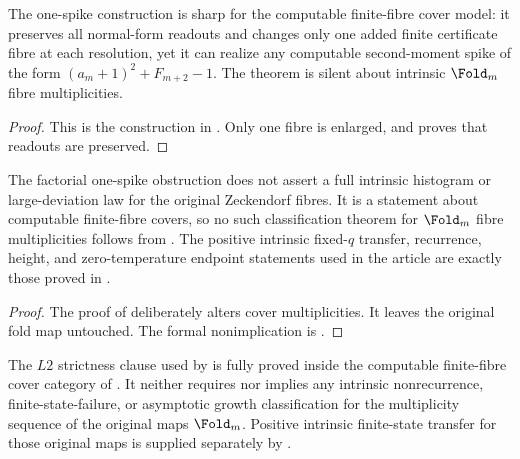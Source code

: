 \begin{theorem}
\label{prop:cover-only-strictness-boundary}
\label{thm:one-spike-finite-state-boundary}
The one-spike construction is sharp for the computable finite-fibre cover model:
it preserves all normal-form readouts and changes only one added finite
certificate fibre at each resolution, yet it can realize any computable
second-moment spike of the form \((a_m+1)^2+F_{m+2}-1\).  The theorem is silent
about intrinsic \(\Fold_m\) fibre multiplicities.
\end{theorem}

\begin{proof}
This is the construction in .
Only one fibre is enlarged, and  proves that
readouts are preserved.
\end{proof}

\begin{theorem}
\label{thm:intrinsic-fold-asymptotics-split}
The factorial one-spike obstruction does not assert a full intrinsic histogram or
large-deviation law for the original Zeckendorf fibres.  It is a statement about
computable finite-fibre covers, so no such classification theorem for
\(\Fold_m\) fibre multiplicities follows from
.  The positive intrinsic fixed-\(q\) transfer,
recurrence, height, and zero-temperature endpoint statements used in the article
are exactly those proved in
.
\end{theorem}

\begin{proof}
The proof of  deliberately alters
cover multiplicities.  It leaves the original fold map untouched.  The formal
nonimplication is .
\end{proof}


\begin{theorem}
\label{thm:L2-cover-relative-closure}
The \(L2\) strictness clause used by  is fully proved
inside the computable finite-fibre cover category of .
It neither requires nor implies any intrinsic nonrecurrence, finite-state-failure,
or asymptotic growth classification for the multiplicity sequence of the original
maps \(\Fold_m\).  Positive intrinsic finite-state transfer for those original
maps is supplied separately by .
\end{theorem}


